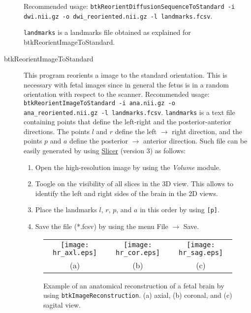 \begin{description}
Recommended usage: \texttt{btkReorientDiffusionSequenceToStandard -i dwi.nii.gz -o dwi\_reoriented.nii.gz -l
landmarks.fcsv}.

\texttt{landmarks} is a landmarks file obtained as explained for btkReorientImageToStandard.

\item[btkReorientImageToStandard] This program reorients a image to the standard orientation. This is necessary with fetal images since in general the fetus is in a random orientation with respect to the scanner.
Recommended usage: \texttt{btkReorientImageToStandard -i ana.nii.gz -o ana\_reoriented.nii.gz -l landmarks.fcsv}.
\texttt{landmarks} is a text file containing points that define the left-right
and the posterior-anterior directions. The points $l$ and $r$ define the left
$\rightarrow$ right direction, and the points $p$ and $a$ define the posterior
$\rightarrow$ anterior direction. Such file can be easily generated by using
\href{http://www.slicer.org}{Slicer} (version 3) as follows:

\begin{enumerate}
\item Open the high-resolution image by using the \textit{Volume} module.
\item Toogle on the visibility of all slices in the 3D view. This allows to
identify the left and right sides of the brain in the 2D views.
\item Place the landmarks $l$, $r$, $p$, and $a$ in this order by using
\texttt{[p]}.
\item Save the file (*.fcsv) by using the menu File $\rightarrow$ Save.
\end{enumerate}


\begin{figure}[t]
\centering
\begin{tabular}{ccc}
\texttt{[image: hr\_axl.eps]}&
\texttt{[image: hr\_cor.eps]}&
\texttt{[image: hr\_sag.eps]}\\
{(a)}&{(b)}&{(c)}\\
\end{tabular}
\caption{Example of an anatomical reconstruction of a fetal brain by using
\texttt{btkImageReconstruction}. (a) axial, (b) coronal, and (c) sagital view.}
\label{fig:reconstruction}
\end{figure}


\end{description}
